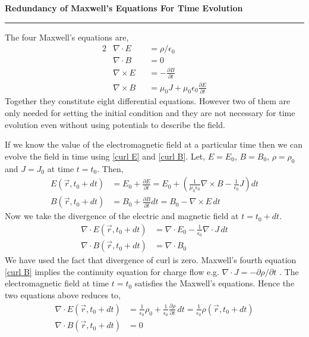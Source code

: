 \documentclass[a4paper, 11pt]{article}
\begin{document}
\begin{center}
	\Large\bfseries Redundancy of Maxwell's Equations For Time Evolution
	\vspace{.15em}\hrule
\end{center}

The four Maxwell's equations are,
\begin{alignat}{2}
	&\nabla \cdot E &&= \rho / \epsilon_0 \label{div E} \\
	&\nabla \cdot B &&= 0 \label{div B} \\
	&\nabla \times E &&= - \frac{\partial B}{\partial t} \label{curl E} \\
	&\nabla \times B &&= \mu_0 J + \mu_0 \epsilon_0 \frac{\partial E}{\partial t} \label{curl B}
\end{alignat}
Together they constitute eight differential equations. However two of them are only needed for
setting the initial condition and they are not necessary for time evolution even without using
potentials to describe the field. \medskip

If we know the value of the electromagnetic field at a particular time then we can evolve the field
in time using \eqref{curl E} and \eqref{curl B}. Let, $E = E_0$, $B = B_0$, $\rho = \rho_0$ and $J =
J_0$ at time $t = t_0$.
Then,
\begin{align}
	E(\vec{r}, t_0 + dt) &= E_0 + \frac{\partial E}{\partial t} = E_0 + \left( \frac{1}{\mu_0
	\epsilon_0} \nabla \times B - \frac{1}{\epsilon_0} J \right) dt \\
	B(\vec{r}, t_0 + dt) &= B_0 + \frac{\partial B}{\partial t} dt = B_0 - \nabla \times E \, dt
\end{align}
Now we take the divergence of the electric and magnetic field at $t = t_0 + dt$.
\begin{align}
	\nabla \cdot E(\vec{r}, t_0 + dt) &= \nabla \cdot E_0 - \frac{1}{\epsilon_0} \nabla \cdot J \, dt
	\\
	\nabla \cdot B(\vec{r}, t_0 + dt) &= \nabla \cdot B_0
\end{align}
We have used the fact that divergence of curl is zero. Maxwell's fourth equation \eqref{curl B}
implies the continuity equation for charge flow e.g. $\nabla \cdot J = - \partial \rho / \partial t$
. The electromagnetic field at time $t = t_0$ satisfies the Maxwell's equations. Hence the two
equations above reduces to,
\begin{align}
	\nabla \cdot E(\vec{r}, t_0 + dt) &= \frac{1}{\epsilon_0} \rho_0 + \frac{1}{\epsilon_0} \frac{
	\partial \rho}{\partial t} \, dt = \frac{1}{\epsilon_0} \rho(\vec{r}, t_0 + dt) \\
\nabla \cdot B(\vec{r}, t_0 + dt) &= 0
\end{align}
\end{document}
